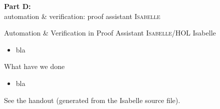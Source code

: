 
\begin{transitionframe}{} \Large \centering
\textbf{Part D:} \\
\quad automation \& verification: proof assistant \textsc{Isabelle} \\[2em]
\end{transitionframe}



\begin{frame}{Automation \& Verification in Proof Assistant \textsc{Isabelle/HOL}} \Large
Isabelle
\begin{itemize}
\item bla
\end{itemize}
\vfill
What have we done
\begin{itemize}
\item bla 
\end{itemize}
\vfill
See the handout (generated from the Isabelle source file).
\end{frame}